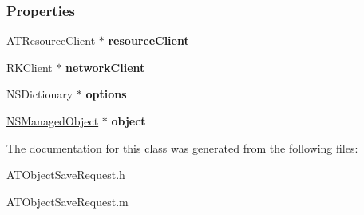 \subsubsection*{Properties}
\begin{DoxyCompactItemize}
\item 
\hypertarget{interface_a_t_object_save_request_a2d8d291a3e16bcea48ab0675b50e7cc6}{
\hyperlink{interface_a_t_resource_client}{ATResourceClient} $\ast$ {\bfseries resourceClient}}
\label{interface_a_t_object_save_request_a2d8d291a3e16bcea48ab0675b50e7cc6}

\item 
\hypertarget{interface_a_t_object_save_request_aec0386776e46384a4284711048edc747}{
RKClient $\ast$ {\bfseries networkClient}}
\label{interface_a_t_object_save_request_aec0386776e46384a4284711048edc747}

\item 
\hypertarget{interface_a_t_object_save_request_ac8448ee55f9108a6627ae8942be5ac84}{
NSDictionary $\ast$ {\bfseries options}}
\label{interface_a_t_object_save_request_ac8448ee55f9108a6627ae8942be5ac84}

\item 
\hypertarget{interface_a_t_object_save_request_a06cf1afe4dfd9bd6f851ed62175a4b2b}{
\hyperlink{class_n_s_managed_object}{NSManagedObject} $\ast$ {\bfseries object}}
\label{interface_a_t_object_save_request_a06cf1afe4dfd9bd6f851ed62175a4b2b}

\end{DoxyCompactItemize}


The documentation for this class was generated from the following files:\begin{DoxyCompactItemize}
\item 
ATObjectSaveRequest.h\item 
ATObjectSaveRequest.m\end{DoxyCompactItemize}
